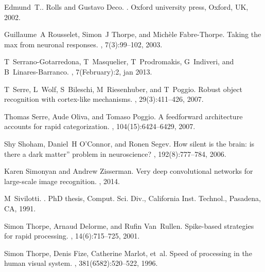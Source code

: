 \documentclass[preprint,5p,12pt,twocolumn]{article}
\begin{document}
\begin{thebibliography}{10}
Edmund~T.. Rolls and Gustavo Deco.
.
\newblock Oxford university press, Oxford, UK, 2002.

Guillaume~A Rousselet, Simon~J Thorpe, and Mich{\`e}le Fabre-Thorpe.
\newblock Taking the max from neuronal responses.
, 7(3):99--102, 2003.

T~Serrano-Gotarredona, T~Masquelier, T~Prodromakis, G~Indiveri, and
  B~Linares-Barranco.
, 7(February):2, jan 2013.

T~Serre, L~Wolf, S~Bileschi, M~Riesenhuber, and T~Poggio.
\newblock Robust object recognition with cortex-like mechanisms.
,
  29(3):411--426, 2007.

Thomas Serre, Aude Oliva, and Tomaso Poggio.
\newblock A feedforward architecture accounts for rapid categorization.
,
  104(15):6424--6429, 2007.

Shy Shoham, Daniel~H O’Connor, and Ronen Segev.
\newblock How silent is the brain: is there a dark matter” problem in
  neuroscience?
, 192(8):777--784, 2006.

Karen Simonyan and Andrew Zisserman.
\newblock Very deep convolutional networks for large-scale image recognition.
, 2014.

M~Sivilotti.
.
\newblock PhD thesis, Comput. Sci. Div., California Inst. Technol., Pasadena,
  CA, 1991.

Simon Thorpe, Arnaud Delorme, and Rufin Van~Rullen.
\newblock Spike-based strategies for rapid processing.
, 14(6):715--725, 2001.

Simon Thorpe, Denis Fize, Catherine Marlot, et~al.
\newblock Speed of processing in the human visual system.
, 381(6582):520--522, 1996.


\end{thebibliography}
\end{document}
